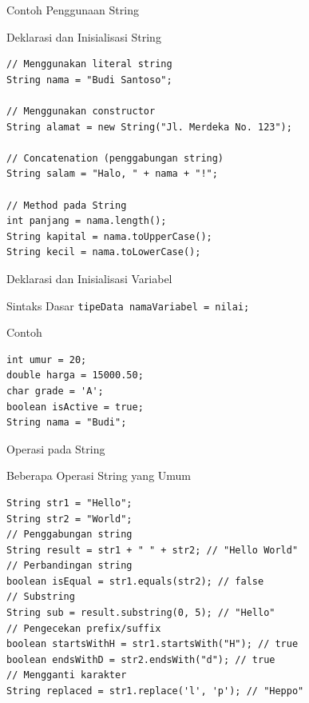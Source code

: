 \documentclass{beamer}
\begin{document}
\begin{frame}[fragile]{Contoh Penggunaan String}
  \begin{exampleblock}{Deklarasi dan Inisialisasi String\\}
\begin{lstlisting}
// Menggunakan literal string
String nama = "Budi Santoso";

// Menggunakan constructor
String alamat = new String("Jl. Merdeka No. 123");

// Concatenation (penggabungan string)
String salam = "Halo, " + nama + "!";

// Method pada String
int panjang = nama.length();
String kapital = nama.toUpperCase();
String kecil = nama.toLowerCase();
\end{lstlisting}
  \end{exampleblock}
\end{frame}

\begin{frame}[fragile]{Deklarasi dan Inisialisasi Variabel}
  \begin{block}{Sintaks Dasar}  
    \texttt{tipeData namaVariabel = nilai;}
  \end{block}
  
  \begin{exampleblock}{Contoh}
\begin{lstlisting}
int umur = 20;
double harga = 15000.50;
char grade = 'A';
boolean isActive = true;
String nama = "Budi";
\end{lstlisting}
  \end{exampleblock}
\end{frame}

\begin{frame}[fragile]{Operasi pada String}
  \begin{exampleblock}{Beberapa Operasi String yang Umum\\}
\begin{lstlisting}
String str1 = "Hello";
String str2 = "World";
// Penggabungan string
String result = str1 + " " + str2; // "Hello World"
// Perbandingan string
boolean isEqual = str1.equals(str2); // false
// Substring
String sub = result.substring(0, 5); // "Hello"
// Pengecekan prefix/suffix
boolean startsWithH = str1.startsWith("H"); // true
boolean endsWithD = str2.endsWith("d"); // true
// Mengganti karakter
String replaced = str1.replace('l', 'p'); // "Heppo"
\end{lstlisting}
  \end{exampleblock}
\end{frame}
\end{document}
